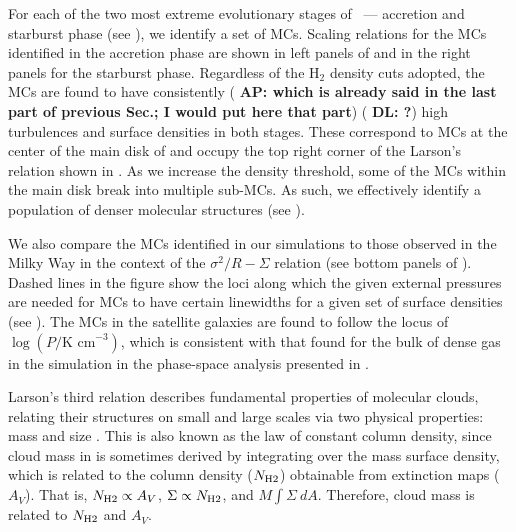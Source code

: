 \IfFileExists{emulateapjlegacy.cls}{\documentclass[iop]{emulateapjlegacy}}{\documentclass[iop]{emulateapj}}
\newcommand{\AP}[1]{({\bf \color{apcolor} AP: #1})}
\newcommand{\DL}[1]{({\bf \color{dlcolor} DL: #1})}
\begin{document}
For each of the two most extreme evolutionary stages of \flower\ --- accretion and starburst phase (see ), we identify a set of MCs.
%
Scaling relations for the MCs identified in the accretion phase are shown in left panels of  and in the right
panels for the starburst phase.
%
Regardless of the H$_2$ density cuts adopted, the MCs are found to have consistently \AP{which is already said in the last part of previous Sec.; I would put here that part} \DL{?}
high turbulences and surface densities in both stages. These correspond to MCs at the center of the main disk of \flower and occupy the top right corner of the Larson's relation shown in .
%
As we increase the density threshold, some of the MCs within the main disk break into multiple sub-MCs. As such, we effectively identify a population of denser molecular structures (see ).

We also compare the MCs identified in our simulations to those observed in the Milky Way in the context of the $\sigma^2/R - \Sigma$ relation (see bottom panels of ). Dashed lines in the figure show the loci along which the given external pressures are
needed for MCs to have certain linewidths for a given set of surface densities (see ).
The MCs in the satellite galaxies are found to follow the locus of $\log{(P/\textrm{K cm}^{-3})}$, which
is consistent with that found for the bulk of dense gas in the simulation in the phase-space analysis presented in \citet{Pallottini17a}.

Larson's third relation describes fundamental properties of molecular clouds, relating their structures on small and large scales via two physical properties: mass and size \citep{Larson81a, McKee07a}. This is also known as the law of constant column density, since cloud mass in \obs is sometimes derived by integrating over the mass surface density, which is related to the column density ($N_{\rm H2}$) obtainable from extinction maps ($A_V$). That is, $N_{\rm H2}\propto A_V$, $\Sigma\propto N_{\rm H2}$, and $M$\eq$\int \Sigma~dA$. Therefore, cloud mass is related to $N_{\rm H2}$ and $A_V$.
\end{document}
